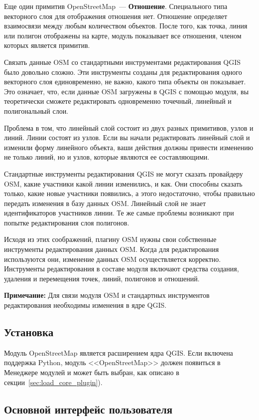 Еще один примитив OpenStreetMap~--- \textbf{Отношение}. Специального
типа векторного слоя для отображения отношения нет. Отношение определяет
взаимосвязи между любым количеством объектов. После того, как точка, линия
или полигон отображены на карте, модуль показывает все отношения, членом
которых является примитив.

Связать данные OSM со стандартными инструментами редактирования QGIS
было довольно сложно. Эти инструменты созданы для редактирования одного
векторного слоя единовременно, не важно, какого типа объекты он показывает.
Это означает, что, если данные OSM загружены в QGIS с помощью модуля, вы
теоретически сможете редактировать одновременно точечный, линейный и
полигональный слои.

Проблема в том, что линейный слой состоит из двух разных примитивов, узлов
и линий. Линии состоят из узлов. Если вы начали редактировать линейный слой
и изменили форму линейного объекта, ваши действия должны привести
изменению не только линий, но и узлов, которые являются ее составляющими.

Стандартные инструменты редактирования QGIS не могут сказать провайдеру
OSM, какие участники какой линии изменились, и как. Они способны сказать
только, какие новые участники появились, а этого недостаточно, чтобы
правильно передать изменения в базу данных OSM. Линейный слой не знает
идентификаторов участников линии. Те же самые проблемы возникают при
попытке редактирования слоя полигонов.

Исходя из этих соображений, плагину OSM нужны свои собственные инструменты
редактирования данных OSM. Когда для редактирования используются они,
изменение данных OSM осуществляется корректно. Инструменты редактирования
в составе модуля включают средства создания, удаления и перемещения точек,
линий, полигонов и отношений.

\textbf{Примечание:} Для связи модуля OSM и стандартных инструментов
редактирования необходимы изменения в ядре QGIS.

\subsection{Установка}

Модуль OpenStreetMap является расширением ядра QGIS. Если включена поддержка
Python, модуль <<OpenStreetMap>> должен появиться в Менеджере модулей и
может быть выбран, как описано в секции~\ref{sec:load_core_plugin}).

\subsection{Основной интерфейс пользователя}

